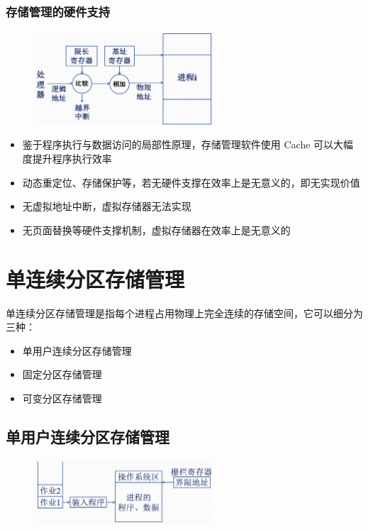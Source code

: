 \documentclass[cs4size,a4paper,10pt]{ctexart}
\begin{document}
	\subsubsection{存储管理的硬件支持}
	\begin{figure}[H]
		\centering
		\includegraphics[width=0.6\textwidth]{img/3.1.4.4}
	\end{figure}
	\begin{itemize}
		\item 鉴于程序执行与数据访问的局部性原理，存储管理软件使用 Cache 可以大幅度提升程序执行效率
		\item 动态重定位、存储保护等，若无硬件支撑在效率上是无意义的，即无实现价值
		\item 无虚拟地址中断，虚拟存储器无法实现
		\item 无页面替换等硬件支撑机制，虚拟存储器在效率上是无意义的
	\end{itemize}

	\section{单连续分区存储管理}
	单连续分区存储管理是指每个进程占用物理上完全连续的存储空间，它可以细分为三种：
	\begin{itemize}
		\item 单用户连续分区存储管理
		\item 固定分区存储管理
		\item 可变分区存储管理
	\end{itemize}

	\subsection{单用户连续分区存储管理}
	\begin{figure}[H]
		\centering
		\includegraphics[width=0.6\textwidth]{img/3.2.1}
	\end{figure}
\end{document}
